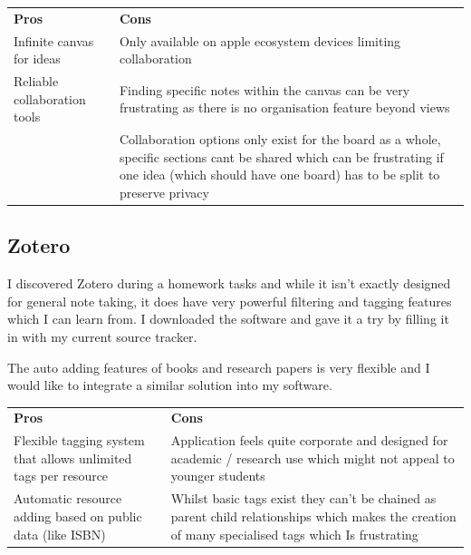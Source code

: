\begin{tabularx}{\textwidth}{>{\raggedright\arraybackslash}X>{\raggedright\arraybackslash}X}
    \rowcolor{gray!15} \textbf{Pros} & \textbf{Cons}                                                             \\ Infinite canvas for ideas  &  Only available on apple ecosystem devices limiting collaboration \\
    Reliable collaboration tools              & Finding specific notes within the canvas can be very frustrating as there is no organisation feature beyond views           \\
                                     & Collaboration options only exist for the board as a whole, specific sections cant be shared which can be frustrating if one idea (which should have one board) has to be split to preserve privacy                                           \\
                                  
\end{tabularx}


\subsection*{Zotero}
I discovered Zotero during a homework tasks and while it isn't exactly designed for general note taking, it does have very powerful filtering and tagging features which I can learn from. I downloaded the software and gave it a try by filling it in with my current source tracker.

The auto adding features of books and research papers is very flexible and I would like to integrate a similar solution into my software.

\begin{tabularx}{\textwidth}{>{\raggedright\arraybackslash}X>{\raggedright\arraybackslash}X}
    \rowcolor{gray!15} \textbf{Pros} & \textbf{Cons}                                                             \\ Flexible tagging system that allows unlimited tags per resource  &  Application feels quite corporate and designed for academic / research use which might not appeal to younger students \\
    Automatic resource adding based on public data (like ISBN)             & Whilst basic tags exist they can't be chained as parent child relationships which makes the creation of many specialised tags which Is frustrating                            \\
                                  
\end{tabularx}
